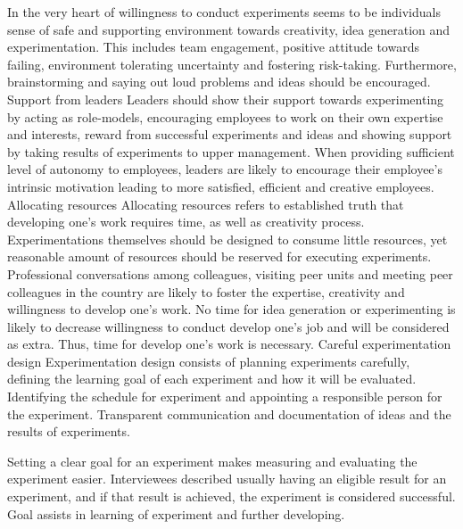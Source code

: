 In the very heart of willingness to conduct experiments seems to be individuals sense of safe and supporting environment towards creativity, idea generation and experimentation. This includes team engagement, positive attitude towards failing, environment tolerating uncertainty and fostering risk-taking. Furthermore, brainstorming and saying out loud problems and ideas should be encouraged. 
\newline
\newline
Support from leaders \newline
Leaders should show their support towards experimenting by acting as role-models, encouraging employees to work on their own expertise and interests, reward from successful experiments and ideas and showing support by taking results of experiments to upper management. When providing sufficient level of autonomy to employees, leaders are likely to encourage their employee's intrinsic motivation leading to more satisfied, efficient and creative employees. 
\newline
\newline
Allocating resources \newline
Allocating resources refers to established truth that developing one's work requires time, as well as creativity process. Experimentations themselves should be designed to consume little resources, yet reasonable amount of resources should be reserved for executing experiments. Professional conversations among colleagues, visiting peer units and meeting peer colleagues in the country are likely to foster the expertise, creativity and willingness to develop one's work. No time for idea generation or experimenting is likely to decrease willingness to conduct develop one's job and will be considered as extra. Thus, time for develop one's work is necessary. 
\newline
\newline
Careful experimentation design \newline
Experimentation design consists of planning experiments carefully, defining the learning goal of each experiment and how it will be evaluated. Identifying the schedule for experiment and appointing a responsible person for the experiment. Transparent communication and documentation of ideas and the results of experiments. 

Setting a clear goal for an experiment makes measuring and evaluating the experiment easier. Interviewees described usually having an eligible result for an experiment, and if that result is achieved, the experiment is considered successful. Goal assists in learning of experiment and further developing. 

